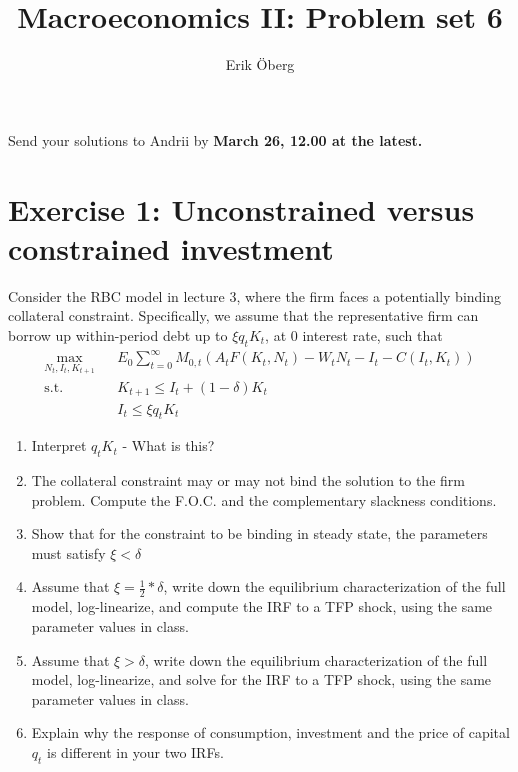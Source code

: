 \documentclass[11pt]{article}
\title{Macroeconomics II: Problem set 6}
\author{Erik \"{O}berg}
\date{}
\newcommand{\ben}{\begin{enumerate}}
\newcommand{\een}{\end{enumerate}}
\begin{document}
\maketitle

Send your solutions to Andrii by \bf March 26, 12.00 \normalfont at the latest.


\section*{Exercise 1: Unconstrained versus constrained investment}
Consider the RBC model in lecture 3, where the firm faces a potentially binding collateral constraint. Specifically, we assume that the representative firm can borrow up within-period debt up to $\xi q_t K_{t} $, at 0 interest rate, such that
\begin{eqnarray}
\max_{N_t, I_t, K_{t+1}} && E_0 \sum_{t=0}^{\infty} M_{0, t} \left(A_t F(K_t, N_t) - W_t N_t - I_t - C(I_t, K_t) \right) \nonumber \\
\text{s.t.} && K_{t+1} \leq I_t + (1-\delta) K_t \nonumber \\
&& I_t \leq \xi q_t K_{t} \nonumber
\end{eqnarray}
\ben
	\item Interpret $q_t K_{t}$ - What is this?
	
	\item The collateral constraint may or may not bind the solution to the firm problem. Compute the F.O.C. and the complementary slackness conditions. 
	
	\item Show that for the constraint to be binding in steady state, the parameters must satisfy $\xi<\delta$ 
	
	\item Assume that $\xi=\frac{1}{2}*\delta$, write down the equilibrium characterization of the full model, log-linearize, and compute the IRF to a TFP shock, using the same parameter values in class.  
	
	\item Assume that $\xi>\delta$, write down the equilibrium characterization of the full model, log-linearize, and solve for the IRF to a TFP shock, using the same parameter values in class.  
	
	\item Explain why the response of consumption, investment and the price of capital $q_t$ is different in your two IRFs.
\een
\end{document}
